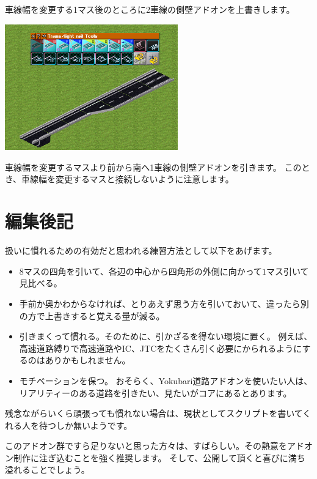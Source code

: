 \documentclass{jbook}
\begin{document}
\begin{multicols}{2}
車線幅を変更する1マス後のところに2車線の側壁アドオンを上書きします。

\includegraphics[width = 75mm]{picture/20210214-road-5-5.png}

車線幅を変更するマスより前から南へ1車線の側壁アドオンを引きます。
このとき、車線幅を変更するマスと接続しないように注意します。

\end{multicols}

\newpage

\section{編集後記}

扱いに慣れるための有効だと思われる練習方法として以下をあげます。
\begin{itemize}
  \item
  $8$マスの四角を引いて、各辺の中心から四角形の外側に向かって$1$マス引いて見比べる。
  \item
  手前か奥かわからなければ、とりあえず思う方を引いておいて、違ったら別の方で上書きすると覚える量が減る。
  \item
  引きまくって慣れる。そのために、引かざるを得ない環境に置く。
  例えば、高速道路縛りで高速道路やIC、JTCをたくさん引く必要にかられるようにするのはありかもしれません。
  \item
  モチベーションを保つ。
  おそらく、Yokubari道路アドオンを使いたい人は、リアリティーのある道路を引きたい、見たいがコアにあるとあります。
\end{itemize}
残念ながらいくら頑張っても慣れない場合は、現状としてスクリプトを書いてくれる人を待つしか無いようです。

\vspace{15pt}
このアドオン群ですら足りないと思った方々は、すばらしい。その熱意をアドオン制作に注ぎ込むことを強く推奨します。
そして、公開して頂くと喜びに満ち溢れることでしょう。

\newpage
\end{document}
